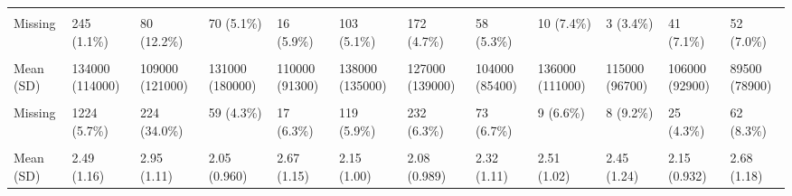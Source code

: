 \documentclass[
  single column]{article}
\begin{document}
\begin{landscape}
\begin{longtable}[t]{llllllllllll}
\addlinespace
\cellcolor{gray!10}{Median [Min, Max]} & \cellcolor{gray!10}{28.0 [0, 100]} & \cellcolor{gray!10}{20.0 [0, 100]} & \cellcolor{gray!10}{9.00 [0, 80.0]} & \cellcolor{gray!10}{20.0 [0, 70.0]} & \cellcolor{gray!10}{24.0 [0, 100]} & \cellcolor{gray!10}{20.8 [0, 100]} & \cellcolor{gray!10}{12.0 [0, 90.0]} & \cellcolor{gray!10}{30.0 [0, 70.0]} & \cellcolor{gray!10}{16.5 [0, 60.0]} & \cellcolor{gray!10}{1.00 [0, 100]} & \cellcolor{gray!10}{13.5 [0, 100]}\\
Missing & 245 (1.1\%) & 80 (12.2\%) & 70 (5.1\%) & 16 (5.9\%) & 103 (5.1\%) & 172 (4.7\%) & 58 (5.3\%) & 10 (7.4\%) & 3 (3.4\%) & 41 (7.1\%) & 52 (7.0\%)\\
\cellcolor{gray!10}{Household Income} & \cellcolor{gray!10}{} & \cellcolor{gray!10}{} & \cellcolor{gray!10}{} & \cellcolor{gray!10}{} & \cellcolor{gray!10}{} & \cellcolor{gray!10}{} & \cellcolor{gray!10}{} & \cellcolor{gray!10}{} & \cellcolor{gray!10}{} & \cellcolor{gray!10}{} & \cellcolor{gray!10}{}\\
Mean (SD) & 134000 (114000) & 109000 (121000) & 131000 (180000) & 110000 (91300) & 138000 (135000) & 127000 (139000) & 104000 (85400) & 136000 (111000) & 115000 (96700) & 106000 (92900) & 89500 (78900)\\
\cellcolor{gray!10}{Median [Min, Max]} & \cellcolor{gray!10}{110000 [0, 2500000]} & \cellcolor{gray!10}{90000 [0, 2000000]} & \cellcolor{gray!10}{90000 [0, 4000000]} & \cellcolor{gray!10}{90000 [0, 670000]} & \cellcolor{gray!10}{110000 [0, 2800000]} & \cellcolor{gray!10}{100000 [0, 5000000]} & \cellcolor{gray!10}{80000 [0, 900000]} & \cellcolor{gray!10}{120000 [0, 700000]} & \cellcolor{gray!10}{99000 [20000, 600000]} & \cellcolor{gray!10}{80000 [8500, 1000000]} & \cellcolor{gray!10}{70000 [0, 900000]}\\
\addlinespace
Missing & 1224 (5.7\%) & 224 (34.0\%) & 59 (4.3\%) & 17 (6.3\%) & 119 (5.9\%) & 232 (6.3\%) & 73 (6.7\%) & 9 (6.6\%) & 8 (9.2\%) & 25 (4.3\%) & 62 (8.3\%)\\
\cellcolor{gray!10}{Left-Wing Authoritarianism} & \cellcolor{gray!10}{} & \cellcolor{gray!10}{} & \cellcolor{gray!10}{} & \cellcolor{gray!10}{} & \cellcolor{gray!10}{} & \cellcolor{gray!10}{} & \cellcolor{gray!10}{} & \cellcolor{gray!10}{} & \cellcolor{gray!10}{} & \cellcolor{gray!10}{} & \cellcolor{gray!10}{}\\
Mean (SD) & 2.49 (1.16) & 2.95 (1.11) & 2.05 (0.960) & 2.67 (1.15) & 2.15 (1.00) & 2.08 (0.989) & 2.32 (1.11) & 2.51 (1.02) & 2.45 (1.24) & 2.15 (0.932) & 2.68 (1.18)\\

\end{longtable}
\end{landscape}
\end{document}
